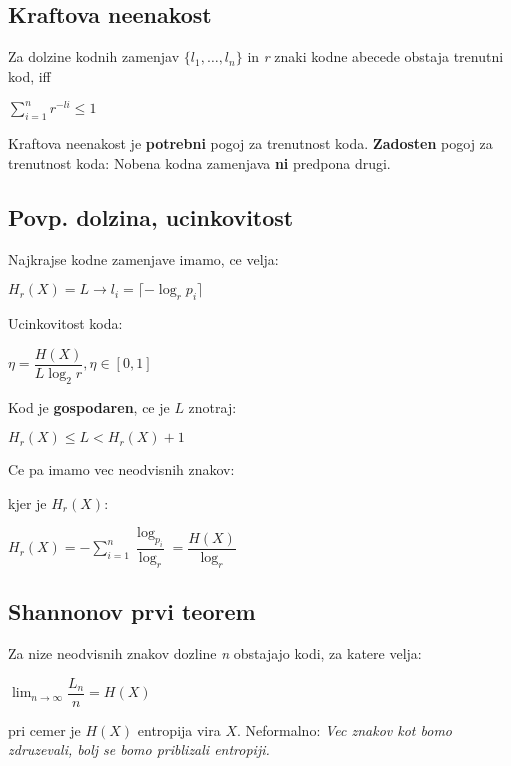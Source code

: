\documentclass{article}
\begin{document}
\begin{multicols}{2}
	\subsection{Kraftova neenakost}
	Za dolzine kodnih zamenjav $\{l_1, \dots, l_n\}$ in \textit{r} znaki kodne abecede
	obstaja trenutni kod, iff
	\begin{center}
		\begin{math}
			\sum_{i=1}^n r^{-li} \leq 1
		\end{math}
	\end{center}
	Kraftova neenakost je \textbf{potrebni} pogoj za trenutnost koda.
	\textbf{Zadosten} pogoj za trenutnost koda: Nobena kodna zamenjava \textbf{ni} predpona drugi.
	\subsection{Povp. dolzina, ucinkovitost}
	Najkrajse kodne zamenjave imamo, ce velja:
	\begin{center}
		\begin{math}
			H_r(X) = L \rightarrow l_i = \lceil - \log_r p_i \rceil
		\end{math}
	\end{center}
	Ucinkovitost koda:
	\begin{center}
		\begin{math}
			\eta = \dfrac{H(X)}{L \log_2 r}, \eta \in [0, 1]
		\end{math}
	\end{center}
	Kod je \textbf{gospodaren}, ce je $L$ znotraj:
	\begin{center}
		\begin{math}
			H_r(X) \leq L < H_r(X) + 1
		\end{math}
	\end{center}
	Ce pa imamo vec neodvisnih znakov:

	kjer je $H_r(X)$:
	\begin{center}
		\begin{math}
			H_r(X) = -\sum^{n}_{i=1} \dfrac{\log_{p_i}}{\log_r} = \dfrac{H(X)}{\log_r}
		\end{math}
	\end{center}

	\subsection{Shannonov prvi teorem}
	Za nize neodvisnih znakov dozline \textit{n} obstajajo kodi,
	za katere velja:
	\begin{center}
		\begin{math}
			\lim_{n \rightarrow \infty} \dfrac{L_n}{n} = H(X)
		\end{math}
	\end{center}
	pri cemer je $H(X)$ entropija vira $X$. Neformalno: \textit{Vec znakov kot bomo
		zdruzevali, bolj se bomo priblizali entropiji.}


\end{multicols}
\end{document}
